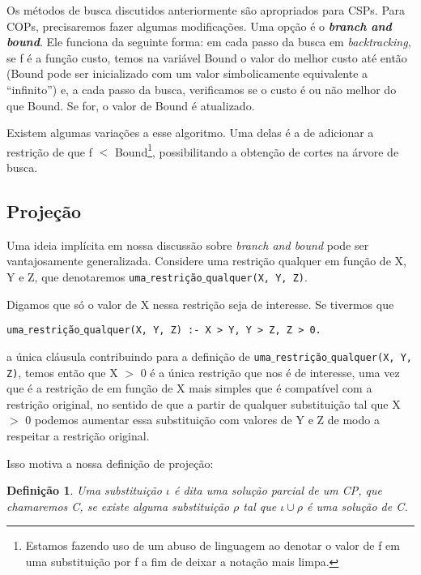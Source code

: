 \documentclass{article}
\newtheorem{definition}{Definição}[section]
\theoremstyle{remark}
\theoremstyle{theorem}
\begin{document}
Os métodos de busca discutidos anteriormente são apropriados para CSPs. Para COPs, precisaremos fazer algumas modificações. Uma opção é o \textit{\textbf{branch and bound}}. Ele funciona da seguinte forma: em cada passo da busca em \textit{backtracking}, se f é a função custo, temos na variável Bound o valor do melhor custo até então (Bound pode ser inicializado com um valor simbolicamente equivalente a ``infinito'') e, a cada passo da busca, verificamos se o custo é ou não melhor do que Bound. Se for, o valor de Bound é atualizado.

Existem algumas variações a esse algoritmo. Uma delas é a de adicionar a restrição de que f $<$ Bound\footnote{Estamos fazendo uso de um abuso de linguagem ao denotar o valor de f em uma substituição por f a fim de deixar a notação mais limpa.}, possibilitando a obtenção de cortes na árvore de busca.

\subsection{Projeção}

Uma ideia implícita em nossa discussão sobre \textit{branch and bound} pode ser vantajosamente generalizada. Considere uma restrição qualquer em função de X, Y e Z, que denotaremos {\tt uma$\_$restrição$\_$qualquer(X, Y, Z)}.

Digamos que só o valor de X nessa restrição seja de interesse. Se tivermos que

{\tt uma$\_$restrição$\_$qualquer(X, Y, Z) :- X > Y, Y > Z, Z > 0.}

 a única cláusula contribuindo para a definição de {\tt uma$\_$restrição$\_$qualquer(X, Y, Z)}, temos então que X $>$ 0
é a única restrição que nos é de interesse, uma vez que é a restrição de em função de X mais simples que é compatível com a restrição original, no sentido de que a partir de qualquer substituição tal que X $>$ 0 podemos aumentar essa substituição com valores de Y e Z de modo a respeitar a restrição original.


Isso motiva a nossa definição de projeção:

\begin{definition}
  Uma substituição $\iota$ é dita uma solução parcial de um CP, que chamaremos C, se existe alguma substituição $\rho$ tal que $\iota \cup \rho$ é uma solução de C.
\end{definition}
\end{document}
